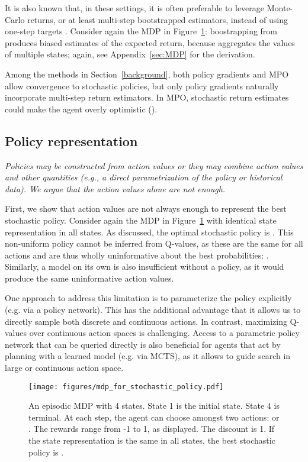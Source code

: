 \documentclass{article}
\begin{document}
It is also known that, in these settings, it is often preferable to leverage Monte-Carlo returns, or at least multi-step bootstrapped estimators, instead of using one-step targets \citep{jaakkola1994}. Consider again the MDP in Figure~\ref{fig:mdp_for_stochastic_policy}: boostrapping from  produces biased estimates of the expected return, because  aggregates the values of multiple states; again, see Appendix~\ref{sec:MDP} for the derivation.

Among the methods in Section~\ref{background}, both policy gradients and MPO allow convergence to stochastic policies, but only policy gradients naturally incorporate multi-step return estimators. In MPO, stochastic return estimates could make the agent overly optimistic (). 

\subsection{Policy representation}

\textit{Policies may be constructed from action values or they may combine action values and other quantities (e.g., a direct parametrization of the policy or historical data). We argue that the action values alone are not enough.}

First, we show that action values are not always enough to represent the best stochastic policy. Consider again the MDP in Figure~\ref{fig:mdp_for_stochastic_policy} with identical state representation  in all states. As discussed, the optimal stochastic policy is . This non-uniform policy cannot be inferred from Q-values, as these are the same for all actions and are thus wholly uninformative about the best probabilities: . Similarly, a model on its own is also insufficient without a policy, as it would produce the same uninformative action values.

One approach to address this limitation is to parameterize the policy explicitly (e.g. via a policy network). This has the additional advantage that it allows us to directly sample both discrete \cite{mnih2016asynchronous} and continuous \cite{vanHasselt2007, degris2012cont, silver2014} actions. In contrast, maximizing Q-values over continuous action spaces is challenging. Access to a parametric policy network that can be queried directly is also beneficial for agents that act by planning with a learned model (e.g. via MCTS), as it allows to guide  search in large or continuous action space.



\begin{figure}[t]
\begin{center}
\centerline{\texttt{[image: figures/mdp\_for\_stochastic\_policy.pdf]}}
\vskip -0.1in
\caption{An episodic MDP with 4 states. State 1 is the initial state. State 4 is terminal. At each step, the agent can choose amongst two actions:  or .
The rewards range from -1 to 1, as displayed. The discount is 1. If the state representation  is the same in all states, the best stochastic policy is .
}
\label{fig:mdp_for_stochastic_policy}
\end{center}
\vskip -0.45in
\end{figure}
\end{document}
